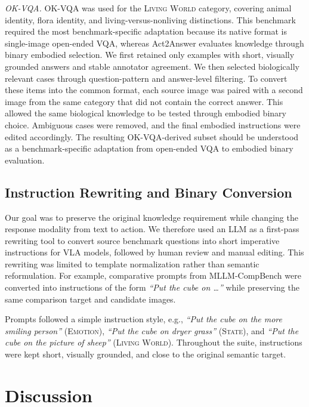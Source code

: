 \documentclass[11pt]{article}
\begin{document}
\noindent\textit{OK-VQA.}
OK-VQA was used for the \textsc{Living World} category, covering animal identity, flora identity, and living-versus-nonliving distinctions. This benchmark required the most benchmark-specific adaptation because its native format is single-image open-ended VQA, whereas Act2Answer evaluates knowledge through binary embodied selection. We first retained only examples with short, visually grounded answers and stable annotator agreement. We then selected biologically relevant cases through question-pattern and answer-level filtering. To convert these items into the common format, each source image was paired with a second image from the same category that did not contain the correct answer. This allowed the same biological knowledge to be tested through embodied binary choice. Ambiguous cases were removed, and the final embodied instructions were edited accordingly. The resulting OK-VQA-derived subset should be understood as a benchmark-specific adaptation from open-ended VQA to embodied binary evaluation.

\subsection{Instruction Rewriting and Binary Conversion}
\label{sec:appendix_instruction_rewriting}

Our goal was to preserve the original knowledge requirement while changing the response modality from text to action. We therefore used an LLM as a first-pass rewriting tool to convert source benchmark questions into short imperative instructions for VLA models, followed by human review and manual editing. This rewriting was limited to template normalization rather than semantic reformulation. For example, comparative prompts from MLLM-CompBench were converted into instructions of the form \textit{``Put the cube on \ldots''} while preserving the same comparison target and candidate images.

Prompts followed a simple instruction style, e.g., \textit{``Put the cube on the more smiling person''} (\textsc{Emotion}), \textit{``Put the cube on dryer grass''} (\textsc{State}), and \textit{``Put the cube on the picture of sheep''} (\textsc{Living World}). Throughout the suite, instructions were kept short, visually grounded, and close to the original semantic target.

\section{Discussion}
\end{document}
